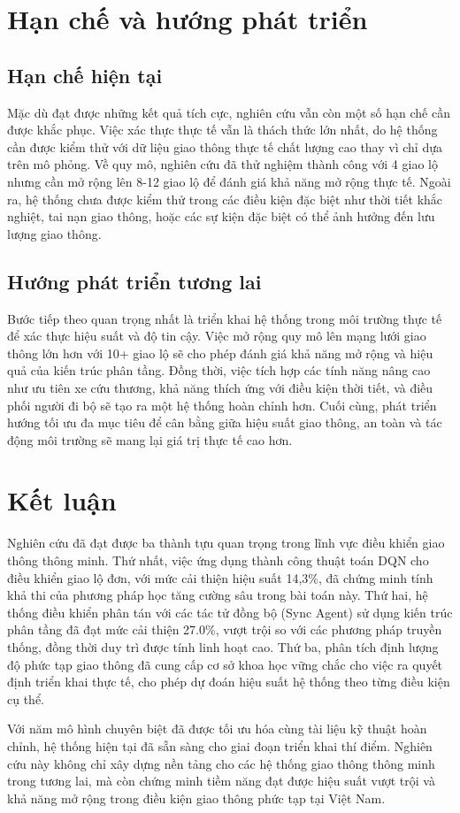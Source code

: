 \section{Hạn chế và hướng phát triển}

\subsection{Hạn chế hiện tại}
Mặc dù đạt được những kết quả tích cực, nghiên cứu vẫn còn một số hạn chế cần được khắc phục. Việc xác thực thực tế vẫn là thách thức lớn nhất, do hệ thống cần được kiểm thử với dữ liệu giao thông thực tế chất lượng cao thay vì chỉ dựa trên mô phỏng. Về quy mô, nghiên cứu đã thử nghiệm thành công với 4 giao lộ nhưng cần mở rộng lên 8-12 giao lộ để đánh giá khả năng mở rộng thực tế. Ngoài ra, hệ thống chưa được kiểm thử trong các điều kiện đặc biệt như thời tiết khắc nghiệt, tai nạn giao thông, hoặc các sự kiện đặc biệt có thể ảnh hưởng đến lưu lượng giao thông.

\subsection{Hướng phát triển tương lai}
Bước tiếp theo quan trọng nhất là triển khai hệ thống trong môi trường thực tế để xác thực hiệu suất và độ tin cậy. Việc mở rộng quy mô lên mạng lưới giao thông lớn hơn với 10+ giao lộ sẽ cho phép đánh giá khả năng mở rộng và hiệu quả của kiến trúc phân tầng. Đồng thời, việc tích hợp các tính năng nâng cao như ưu tiên xe cứu thương, khả năng thích ứng với điều kiện thời tiết, và điều phối người đi bộ sẽ tạo ra một hệ thống hoàn chỉnh hơn. Cuối cùng, phát triển hướng tối ưu đa mục tiêu để cân bằng giữa hiệu suất giao thông, an toàn và tác động môi trường sẽ mang lại giá trị thực tế cao hơn.

\section{Kết luận}

Nghiên cứu đã đạt được ba thành tựu quan trọng trong lĩnh vực điều khiển giao thông thông minh. Thứ nhất, việc ứng dụng thành công thuật toán DQN cho điều khiển giao lộ đơn, với mức cải thiện hiệu suất 14,3\%, đã chứng minh tính khả thi của phương pháp học tăng cường sâu trong bài toán này. Thứ hai, hệ thống điều khiển phân tán với các tác tử đồng bộ (Sync Agent) sử dụng kiến trúc phân tầng đã đạt mức cải thiện 27.0\%, vượt trội so với các phương pháp truyền thống, đồng thời duy trì được tính linh hoạt cao. Thứ ba, phân tích định lượng độ phức tạp giao thông đã cung cấp cơ sở khoa học vững chắc cho việc ra quyết định triển khai thực tế, cho phép dự đoán hiệu suất hệ thống theo từng điều kiện cụ thể.

Với năm mô hình chuyên biệt đã được tối ưu hóa cùng tài liệu kỹ thuật hoàn chỉnh, hệ thống hiện tại đã sẵn sàng cho giai đoạn triển khai thí điểm. Nghiên cứu này không chỉ xây dựng nền tảng cho các hệ thống giao thông thông minh trong tương lai, mà còn chứng minh tiềm năng đạt được hiệu suất vượt trội và khả năng mở rộng trong điều kiện giao thông phức tạp tại Việt Nam.
